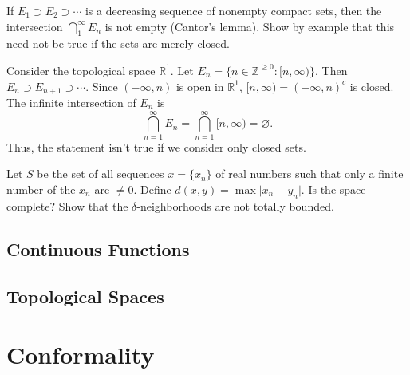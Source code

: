 \begin{exercise}
\item
  If \(E_1\supset E_2\supset\cdots\) is a decreasing sequence of nonempty
  compact sets, then the intersection \(\bigcap_1^{\infty}E_n\) is not empty
  (Cantor's lemma).
  Show by example that this need not be true if the sets are merely closed.
  \par\smallskip
  Consider the topological space \(\mathbb{R}^1\).
  Let \(E_n = \{n\in\mathbb{Z}^{\geq 0}\colon [n,\infty)\}\).
  Then \(E_n\supset E_{n + 1}\supset\cdots\).
  Since \((-\infty,n)\) is open in \(\mathbb{R}^1\),
  \([n,\infty) = (-\infty,n)^c\) is closed.
  The infinite intersection of \(E_n\) is
  \[
  \bigcap_{n = 1}^{\infty}E_n = \bigcap_{n = 1}^{\infty}[n, \infty) =
  \varnothing.
  \]
  Thus, the statement isn't true if we consider only closed sets.
\item
  Let \(S\) be the set of all sequences \(x = \{x_n\}\) of real numbers such
  that only a finite number of the \(x_n\) are \(\neq 0\).
  Define \(d(x,y) = \max\lvert x_n - y_n\rvert\).
  Is the space complete?
  Show that the \(\delta\)-neighborhoods are not totally bounded.
\end{exercise}

\subsection{Continuous Functions}

\subsection{Topological Spaces}

\section{Conformality}

